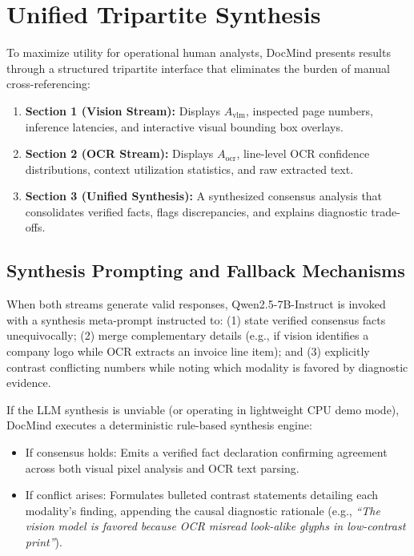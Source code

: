 \documentclass[conference]{IEEEtran}
\begin{document}
{\section{Unified Tripartite Synthesis}

To maximize utility for operational human analysts, DocMind presents results through a structured tripartite interface that eliminates the burden of manual cross-referencing:
\begin{enumerate}
    \item \textbf{Section 1 (Vision Stream):} Displays $A_{\text{vlm}}$, inspected page numbers, inference latencies, and interactive visual bounding box overlays.
    \item \textbf{Section 2 (OCR Stream):} Displays $A_{\text{ocr}}$, line-level OCR confidence distributions, context utilization statistics, and raw extracted text.
    \item \textbf{Section 3 (Unified Synthesis):} A synthesized consensus analysis that consolidates verified facts, flags discrepancies, and explains diagnostic trade-offs.
\end{enumerate}

\subsection{Synthesis Prompting and Fallback Mechanisms}
When both streams generate valid responses, Qwen2.5-7B-Instruct is invoked with a synthesis meta-prompt instructed to: (1) state verified consensus facts unequivocally; (2) merge complementary details (e.g., if vision identifies a company logo while OCR extracts an invoice line item); and (3) explicitly contrast conflicting numbers while noting which modality is favored by diagnostic evidence.

If the LLM synthesis is unviable (or operating in lightweight CPU demo mode), DocMind executes a deterministic rule-based synthesis engine:
\begin{itemize}
    \item If consensus holds: Emits a verified fact declaration confirming agreement across both visual pixel analysis and OCR text parsing.
    \item If conflict arises: Formulates bulleted contrast statements detailing each modality's finding, appending the causal diagnostic rationale (e.g., \textit{``The vision model is favored because OCR misread look-alike glyphs in low-contrast print''}).
\end{itemize}

}
\end{document}
